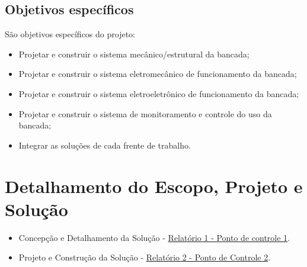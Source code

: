    \subsection{Objetivos específicos}
       São objetivos específicos do projeto:
       \begin{itemize}

        \item Projetar e construir o sistema mecânico/estrutural da bancada;
        \item Projetar e construir o sistema eletromecânico de funcionamento da bancada;
        \item Projetar e construir o sistema eletroeletrônico de funcionamento da bancada;
        \item Projetar e construir o sistema de monitoramento e controle do uso da bancada;
        \item Integrar as soluções de cada frente de trabalho.
       \end{itemize}

    \section{Detalhamento do Escopo, Projeto e Solução}

       \begin{itemize}
	\item Concepção e Detalhamento da Solução - \href{https://drive.google.com/file/d/0B5InkGKx6O-MR1B3eVYzZFpjQ3c/view?usp=sharing}{Relatório 1 - Ponto de controle 1}.
             \item Projeto e Construção da Solução - \href{https://drive.google.com/open?id=0B5InkGKx6O-MR1RCY1M5R2otcFk}{Relatório 2 - Ponto de Controle 2}.
       \end{itemize}


